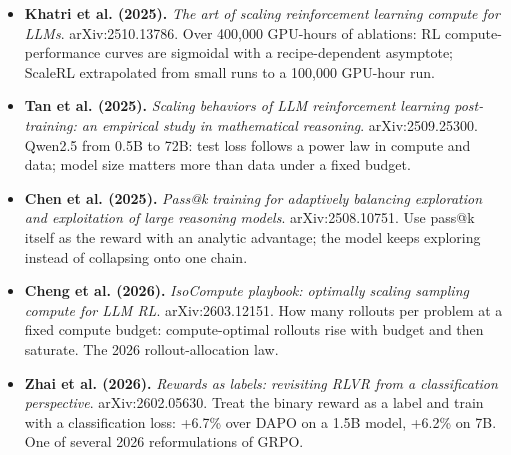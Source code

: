 \begin{itemize}[leftmargin=1.2em,itemsep=3pt]
\item \textbf{Khatri et al. (2025).} \textit{The art of scaling reinforcement learning compute for LLMs}. arXiv:2510.13786. Over 400,000 GPU-hours of ablations: RL compute-performance curves are sigmoidal with a recipe-dependent asymptote; ScaleRL extrapolated from small runs to a 100,000 GPU-hour run.
\item \textbf{Tan et al. (2025).} \textit{Scaling behaviors of LLM reinforcement learning post-training: an empirical study in mathematical reasoning}. arXiv:2509.25300. Qwen2.5 from 0.5B to 72B: test loss follows a power law in compute and data; model size matters more than data under a fixed budget.
\item \textbf{Chen et al. (2025).} \textit{Pass@k training for adaptively balancing exploration and exploitation of large reasoning models}. arXiv:2508.10751. Use pass@k itself as the reward with an analytic advantage; the model keeps exploring instead of collapsing onto one chain.
\item \textbf{Cheng et al. (2026).} \textit{IsoCompute playbook: optimally scaling sampling compute for LLM RL}. arXiv:2603.12151. How many rollouts per problem at a fixed compute budget: compute-optimal rollouts rise with budget and then saturate. The 2026 rollout-allocation law.
\item \textbf{Zhai et al. (2026).} \textit{Rewards as labels: revisiting RLVR from a classification perspective}. arXiv:2602.05630. Treat the binary reward as a label and train with a classification loss: +6.7\% over DAPO on a 1.5B model, +6.2\% on 7B. One of several 2026 reformulations of GRPO.
\end{itemize}
